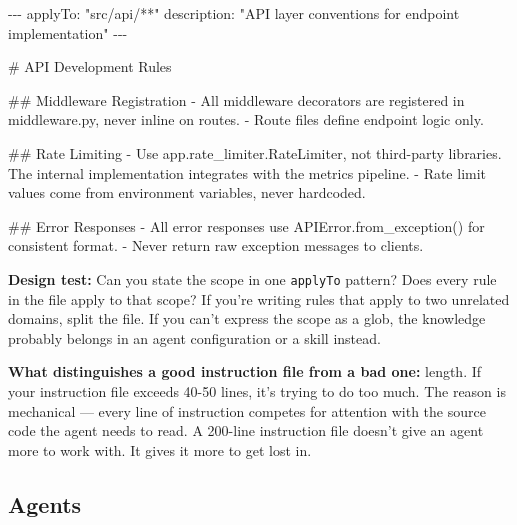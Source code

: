 \documentclass[
  a4paper,
  DIV=11,
  numbers=noendperiod]{scrreprt}
\newenvironment{Shaded}{\begin{snugshade}}{\end{snugshade}}
\newcommand{\AnnotationTok}[1]{\textcolor[rgb]{0.37,0.37,0.37}{#1}}
\newcommand{\CommentTok}[1]{\textcolor[rgb]{0.37,0.37,0.37}{#1}}
\newcommand{\FunctionTok}[1]{\textcolor[rgb]{0.28,0.35,0.67}{#1}}
\newcommand{\InformationTok}[1]{\textcolor[rgb]{0.37,0.37,0.37}{#1}}
\newcommand{\NormalTok}[1]{\textcolor[rgb]{0.00,0.23,0.31}{#1}}
\newcommand{\SpecialStringTok}[1]{\textcolor[rgb]{0.13,0.47,0.30}{#1}}
\begin{document}
\begin{Shaded}
\begin{Highlighting}[]
\CommentTok{{-}{-}{-}}
\AnnotationTok{applyTo:}\CommentTok{ "src/api/**"}
\AnnotationTok{description:}\CommentTok{ "API layer conventions for endpoint implementation"}
\CommentTok{{-}{-}{-}}

\FunctionTok{\# API Development Rules}

\FunctionTok{\#\# Middleware Registration}
\SpecialStringTok{{-} }\NormalTok{All middleware decorators are registered in }\InformationTok{\textasciigrave{}middleware.py\textasciigrave{}}\NormalTok{, never inline on routes.}
\SpecialStringTok{{-} }\NormalTok{Route files define endpoint logic only.}

\FunctionTok{\#\# Rate Limiting}
\SpecialStringTok{{-} }\NormalTok{Use }\InformationTok{\textasciigrave{}app.rate\_limiter.RateLimiter\textasciigrave{}}\NormalTok{, not third{-}party libraries.}
\NormalTok{  The internal implementation integrates with the metrics pipeline.}
\SpecialStringTok{{-} }\NormalTok{Rate limit values come from environment variables, never hardcoded.}

\FunctionTok{\#\# Error Responses}
\SpecialStringTok{{-} }\NormalTok{All error responses use }\InformationTok{\textasciigrave{}APIError.from\_exception()\textasciigrave{}}\NormalTok{ for consistent format.}
\SpecialStringTok{{-} }\NormalTok{Never return raw exception messages to clients.}
\end{Highlighting}
\end{Shaded}

\textbf{Design test:} Can you state the scope in one \texttt{applyTo}
pattern? Does every rule in the file apply to that scope? If you're
writing rules that apply to two unrelated domains, split the file. If
you can't express the scope as a glob, the knowledge probably belongs in
an agent configuration or a skill instead.

\textbf{What distinguishes a good instruction file from a bad one:}
length. If your instruction file exceeds 40-50 lines, it's trying to do
too much. The reason is mechanical --- every line of instruction
competes for attention with the source code the agent needs to read. A
200-line instruction file doesn't give an agent more to work with. It
gives it more to get lost in.

\subsection{Agents}\label{agents}
\end{document}
